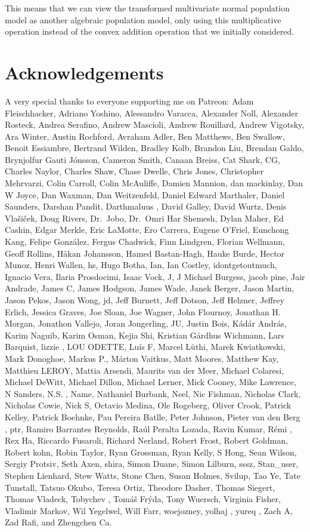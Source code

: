 \documentclass[
  letterpaper,
  DIV=11,
  numbers=noendperiod]{scrartcl}
\begin{document}
This means that we can view the transformed multivariate normal
population model as another algebraic population model, only using this
multiplicative operation instead of the convex addition operation that
we initially considered.

\section*{Acknowledgements}\label{acknowledgements}

A very special thanks to everyone supporting me on Patreon: Adam
Fleischhacker, Adriano Yoshino, Alessandro Varacca, Alexander Noll,
Alexander Rosteck, Andrea Serafino, Andrew Mascioli, Andrew Rouillard,
Andrew Vigotsky, Ara Winter, Austin Rochford, Avraham Adler, Ben
Matthews, Ben Swallow, Benoit Essiambre, Bertrand Wilden, Bradley Kolb,
Brandon Liu, Brendan Galdo, Brynjolfur Gauti Jónsson, Cameron Smith,
Canaan Breiss, Cat Shark, CG, Charles Naylor, Charles Shaw, Chase
Dwelle, Chris Jones, Christopher Mehrvarzi, Colin Carroll, Colin
McAuliffe, Damien Mannion, dan mackinlay, Dan W Joyce, Dan Waxman, Dan
Weitzenfeld, Daniel Edward Marthaler, Daniel Saunders, Darshan Pandit,
Darthmaluus , David Galley, David Wurtz, Denis Vlašiček, Doug Rivers,
Dr.~Jobo, Dr.~Omri Har Shemesh, Dylan Maher, Ed Cashin, Edgar Merkle,
Eric LaMotte, Ero Carrera, Eugene O'Friel, Eunchong Kang, Felipe
González, Fergus Chadwick, Finn Lindgren, Florian Wellmann, Geoff
Rollins, Håkan Johansson, Hamed Bastan-Hagh, Hauke Burde, Hector Munoz,
Henri Wallen, hs, Hugo Botha, Ian, Ian Costley, idontgetoutmuch, Ignacio
Vera, Ilaria Prosdocimi, Isaac Vock, J, J Michael Burgess, jacob pine,
Jair Andrade, James C, James Hodgson, James Wade, Janek Berger, Jason
Martin, Jason Pekos, Jason Wong, jd, Jeff Burnett, Jeff Dotson, Jeff
Helzner, Jeffrey Erlich, Jessica Graves, Joe Sloan, Joe Wagner, John
Flournoy, Jonathan H. Morgan, Jonathon Vallejo, Joran Jongerling, JU,
Justin Bois, Kádár András, Karim Naguib, Karim Osman, Kejia Shi,
Kristian Gårdhus Wichmann, Lars Barquist, lizzie , LOU ODETTE, Luís F,
Marcel Lüthi, Marek Kwiatkowski, Mark Donoghoe, Markus P., Márton
Vaitkus, Matt Moores, Matthew Kay, Matthieu LEROY, Mattia Arsendi,
Maurits van der Meer, Michael Colaresi, Michael DeWitt, Michael Dillon,
Michael Lerner, Mick Cooney, Mike Lawrence, N Sanders, N.S. , Name,
Nathaniel Burbank, Neel, Nic Fishman, Nicholas Clark, Nicholas Cowie,
Nick S, Octavio Medina, Ole Rogeberg, Oliver Crook, Patrick Kelley,
Patrick Boehnke, Pau Pereira Batlle, Peter Johnson, Pieter van den Berg
, ptr, Ramiro Barrantes Reynolds, Raúl Peralta Lozada, Ravin Kumar, Rémi
, Rex Ha, Riccardo Fusaroli, Richard Nerland, Robert Frost, Robert
Goldman, Robert kohn, Robin Taylor, Ryan Grossman, Ryan Kelly, S Hong,
Sean Wilson, Sergiy Protsiv, Seth Axen, shira, Simon Duane, Simon
Lilburn, sssz, Stan\_user, Stephen Lienhard, Stew Watts, Stone Chen,
Susan Holmes, Svilup, Tao Ye, Tate Tunstall, Tatsuo Okubo, Teresa Ortiz,
Theodore Dasher, Thomas Siegert, Thomas Vladeck, Tobychev , Tomáš Frýda,
Tony Wuersch, Virginia Fisher, Vladimir Markov, Wil Yegelwel, Will Farr,
woejozney, yolhaj , yureq , Zach A, Zad Rafi, and Zhengchen Ca.
\end{document}
